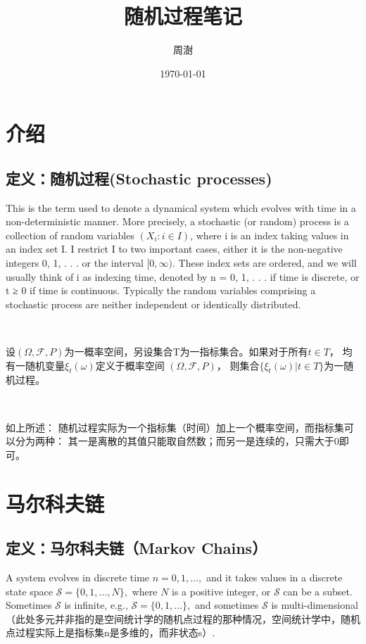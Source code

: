 \documentclass[UTF8]{ctexart}
\title{随机过程笔记}
\author{周澍}
\date{\today}
\begin{document}
\maketitle
\section{介绍}

\subsection{定义：随机过程(Stochastic processes)}


This is the term used to denote a dynamical system which evolves with time in a non-deterministic manner. More precisely, a stochastic (or random) process is a collection of random variables $(X_i: i ∈ I)$, where i is an index taking values in an index set I. I restrict I to two important cases, either it is the non-negative integers 0, 1, . . . or the interval $[0, ∞)$. These index sets are ordered, and we will usually think of i as indexing time, denoted by n = 0, 1, . . . if time is discrete, or t ≥ 0 if time is continuous. Typically the random variables comprising a stochastic process are neither independent or identically distributed.

\

设\begin{math}
    {\displaystyle (\Omega ,{\mathcal {F}},P)}
\end{math}为一概率空间，另设集合T为一指标集合。如果对于所有${\displaystyle t\in T}$，
均有一随机变量${\displaystyle \xi _{t}(\omega )}$定义于概率空间
${\displaystyle (\Omega ,{\mathcal {F}},P)}$，
则集合${\displaystyle \{\xi _{t}(\omega )|t\in T\}}$为一随机过程。

\

如上所述： 随机过程实际为一个指标集（时间）加上一个概率空间，而指标集可以分为两种：
其一是离散的其值只能取自然数；而另一是连续的，只需大于0即可。

\section{马尔科夫链}

\subsection{定义：马尔科夫链（Markov Chains）}

A system evolves in discrete time $n=0,1, 
\ldots,$ and it takes values in a discrete state space 
$\mathcal{S}=\{0,1, \ldots, N\},$ where $N$ is a positive 
integer, or $\mathcal{S}$ can be a subset. Sometimes $\mathcal{S}$ is infinite, e.g., $\mathcal{S}=\{0,1, \ldots\},$ and sometimes $\mathcal{S}$ is multi-dimensional（此处多元并非指的是空间统计学的随机点过程的那种情况，空间统计学中，随机点过程实际上是指标集n是多维的，而非状态s）. 
\end{document}
